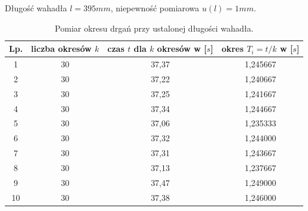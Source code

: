 \documentclass[a4paper,11pt]{article}
\begin{document}
\begin{table}[ht]
\centering
\setlength{\extrarowheight}{1.5pt}
\caption{Pomiar okresu drgań przy ustalonej długości wahadła.}
Długość wahadła $l = 395 mm$, niepewność pomiarowa $u(l) = 1 mm$.
\begin{tabular}{|c|c|c|c|}
\hline
Lp. & liczba okresów $k$ & czas $t$ dla $k$ okresów w [$s$] & okres $T_{i}=t/k$ w [$s$] \\ \hline
1 & 30 & 37,37 & 1,245667\\ \hline
2 & 30 & 37,22 & 1,240667\\ \hline
3 & 30 & 37,25 & 1,241667\\ \hline
4 & 30 & 37,34 & 1,244667\\ \hline
5 & 30 & 37,06 & 1,235333\\ \hline
6 & 30 & 37,32 & 1,244000\\ \hline
7 & 30 & 37,31 & 1,243667\\ \hline
8 & 30 & 37,13 & 1,237667\\ \hline
9 & 30 & 37,47 & 1,249000\\ \hline
10 & 30 & 37,38 & 1,246000\\ \hline
\end{tabular}
\end{table}
\end{document}
